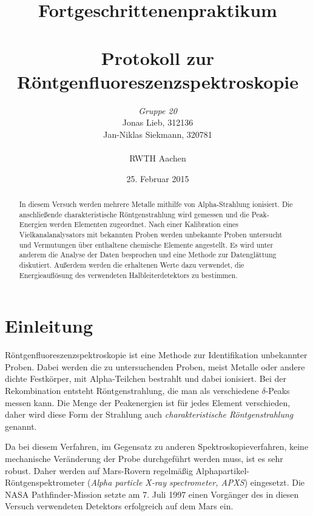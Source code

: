 \documentclass{../Misc/MontavonLaTeX/Montavon}
\date{25. Februar 2015}
\begin{document}
\title{Fortgeschrittenenpraktikum \\ \quad \\ Protokoll zur \\ Röntgenfluoreszenzspektroskopie }
\author{\emph{Gruppe 20} \\  Jonas Lieb, 312136 \\ Jan-Niklas Siekmann, 320781 \\ \ \\  RWTH Aachen}
\maketitle
\begin{abstract}
In diesem Versuch werden mehrere Metalle mithilfe von Alpha-Strahlung ionisiert. Die anschließende charakteristische Röntgenstrahlung wird gemessen und die Peak-Energien werden Elementen zugeordnet. Nach einer Kalibration eines Vielkanalanalysators mit bekannten Proben werden unbekannte Proben untersucht und Vermutungen über enthaltene chemische Elemente angestellt. Es wird unter anderem die Analyse der Daten besprochen und eine Methode zur Datenglättung diskutiert. Außerdem werden die erhaltenen Werte dazu verwendet, die Energieauflösung des verwendeten Halbleiterdetektors zu bestimmen.
\end{abstract}
\newpage

\tableofcontents
\newpage

\section{Einleitung}
Röntgenfluoreszenzspektroskopie ist eine Methode zur Identifikation unbekannter Proben. Dabei werden die zu untersuchenden Proben, meist Metalle oder andere dichte Festkörper, mit Alpha-Teilchen bestrahlt und dabei ionisiert. Bei der Rekombination entsteht Röntgenstrahlung, die man als verschiedene $\delta$-Peaks messen kann. Die Menge der Peakenergien ist für jedes Element verschieden, daher wird diese Form der Strahlung auch \emph{charakteristische Röntgenstrahlung} genannt.

Da bei diesem Verfahren, im Gegensatz zu anderen Spektroskopieverfahren, keine mechanische Veränderung der Probe durchgeführt werden muss, ist es sehr robust. Daher werden auf Mars-Rovern regelmäßig Alphapartikel-Röntgenspektrometer (\emph{Alpha particle X-ray spectrometer, APXS}) eingesetzt.
Die NASA Pathfinder-Mission setzte am 7. Juli 1997 einen Vorgänger des in diesen Versuch verwendeten Detektors erfolgreich auf dem Mars ein\cite{amptek-press-releases}.
\end{document}
